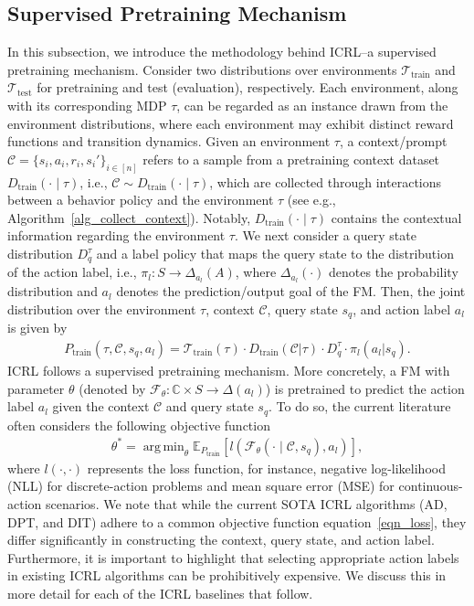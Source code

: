 \documentclass[10pt]{article}
\def\eqref#1{equation~\ref{#1}}
\DeclareMathOperator*{\argmin}{arg\,min}
\def\mbC{{\ensuremath{\mathbb C}}}
\def\mbE{{\ensuremath{\mathbb E}}}
\def\ccalC{{\ensuremath{\mathcal C}}}
\def\ccalF{{\ensuremath{\mathcal F}}}
\def\ccalT{{\ensuremath{\mathcal T}}}
\begin{document}
\subsection{Supervised Pretraining Mechanism}
In this subsection, we introduce the methodology behind ICRL--a supervised pretraining mechanism. Consider two distributions over environments $\ccalT_{\text{train}}$ and $\ccalT_{\text{test}}$ {for} pretraining and test (evaluation), respectively. Each environment, along with its corresponding MDP $\tau$, can be regarded as an instance drawn from the environment distributions, where each environment may exhibit distinct reward functions and transition dynamics.
Given an environment $\tau$, a context/prompt $\ccalC = \{s_i, a_i, r_i, s_i'\}_{i \in [n]}$ refers to a sample from a pretraining context dataset $D_{\text{train}} (\cdot \mid \tau)$, i.e., $\ccalC \sim D_{\text{train}} (\cdot \mid \tau)$, which are collected through interactions between a behavior policy and the environment $\tau$ (see e.g., Algorithm~\ref{alg_collect_context}). Notably, $D_{\text{train}} (\cdot \mid \tau)$ contains the contextual information regarding the environment $\tau$.
We next consider a query state distribution $D_q^\tau$ and a label policy that maps the query state to the distribution of the action label, i.e., $\pi_{l}: S \to \Delta_{a_l} (A)$, where $\Delta_{a_l}(\cdot)$ denotes the probability distribution and $a_l$ denotes the prediction/output goal of the FM.
Then, the joint distribution over the environment $\tau$, context $\ccalC$, query state $s_{q}$, and action label $a_{l}$ is given by
\begin{align}\label{eqn_pretrain_distribution}
    P_{\text{train}} (\tau, \ccalC, s_{q}, a_{l}) = \ccalT_{\text{train}} (\tau) \cdot D_{\text{train}} (\ccalC | \tau) \cdot D_q^\tau \cdot \pi_{l}(a_{l} | s_{q}).
\end{align}
ICRL follows a supervised pretraining mechanism. More concretely, a FM with parameter $\theta$ (denoted by $\ccalF_\theta: \mbC \times S \to \Delta (a_{l})$) is pretrained to predict the action label $a_{l}$ given the context $\ccalC$ and query state $s_{q}$. To do so, the current literature~\citep{laskin2022context, lee2024supervised, dong2024context} often considers the following objective function
\begin{align}\label{eqn_loss}
    \theta^* = \argmin_\theta \mbE_{P_{\text{train}}} \left[ l \left( \ccalF_\theta(\cdot \mid \ccalC, s_{q}), a_{l}\right) \right],
\end{align}
where $l(\cdot, \cdot)$ represents the loss function, for instance, negative log-likelihood (NLL) for discrete-action problems and mean square error (MSE) for continuous-action scenarios.
We note that while the current SOTA ICRL algorithms (AD, DPT, and DIT) adhere to a common objective function \eqref{eqn_loss}, they differ significantly in constructing the context, query state, and action label.
Furthermore, it is important to highlight that selecting appropriate action labels in existing ICRL algorithms can be prohibitively expensive. We discuss this in more detail for each of the ICRL baselines  that follow.
\end{document}
